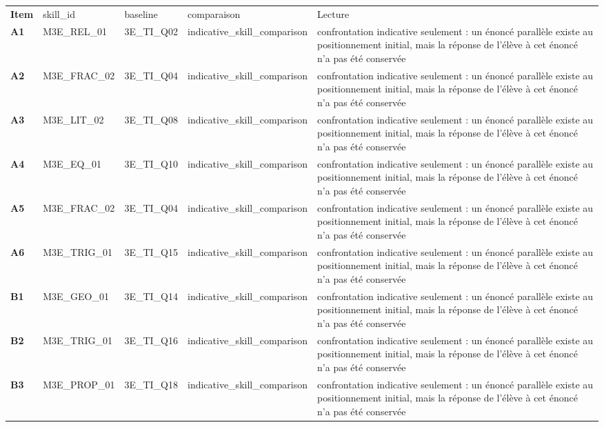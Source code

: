 \documentclass[10pt,a4paper]{article}
\begin{document}
\par\noindent\begin{tabularx}{\linewidth}{>{\bfseries}p{9mm} >{\ttfamily\scriptsize}p{25mm} >{\ttfamily\scriptsize}p{22mm} >{\ttfamily\scriptsize}p{16mm} X}
\rowcolor{Navy}\color{white}Item & \color{white}\scriptsize skill\_id & \color{white}\scriptsize baseline & \color{white}\scriptsize comparaison & \color{white}Lecture \\
A1 & M3E\_REL\_01 & 3E\_TI\_Q02 & indicative\_skill\_comparison & confrontation indicative seulement : un énoncé parallèle existe au positionnement initial, mais la réponse de l'élève à cet énoncé n'a pas été conservée \\
A2 & M3E\_FRAC\_02 & 3E\_TI\_Q04 & indicative\_skill\_comparison & confrontation indicative seulement : un énoncé parallèle existe au positionnement initial, mais la réponse de l'élève à cet énoncé n'a pas été conservée \\
A3 & M3E\_LIT\_02 & 3E\_TI\_Q08 & indicative\_skill\_comparison & confrontation indicative seulement : un énoncé parallèle existe au positionnement initial, mais la réponse de l'élève à cet énoncé n'a pas été conservée \\
A4 & M3E\_EQ\_01 & 3E\_TI\_Q10 & indicative\_skill\_comparison & confrontation indicative seulement : un énoncé parallèle existe au positionnement initial, mais la réponse de l'élève à cet énoncé n'a pas été conservée \\
A5 & M3E\_FRAC\_02 & 3E\_TI\_Q04 & indicative\_skill\_comparison & confrontation indicative seulement : un énoncé parallèle existe au positionnement initial, mais la réponse de l'élève à cet énoncé n'a pas été conservée \\
A6 & M3E\_TRIG\_01 & 3E\_TI\_Q15 & indicative\_skill\_comparison & confrontation indicative seulement : un énoncé parallèle existe au positionnement initial, mais la réponse de l'élève à cet énoncé n'a pas été conservée \\
B1 & M3E\_GEO\_01 & 3E\_TI\_Q14 & indicative\_skill\_comparison & confrontation indicative seulement : un énoncé parallèle existe au positionnement initial, mais la réponse de l'élève à cet énoncé n'a pas été conservée \\
B2 & M3E\_TRIG\_01 & 3E\_TI\_Q16 & indicative\_skill\_comparison & confrontation indicative seulement : un énoncé parallèle existe au positionnement initial, mais la réponse de l'élève à cet énoncé n'a pas été conservée \\
B3 & M3E\_PROP\_01 & 3E\_TI\_Q18 & indicative\_skill\_comparison & confrontation indicative seulement : un énoncé parallèle existe au positionnement initial, mais la réponse de l'élève à cet énoncé n'a pas été conservée \\

\end{tabularx}
\end{document}
